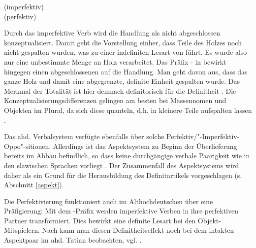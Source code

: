 \begin{exe}
	\ex \label{ex:russ-aspekt}   
	\begin{xlist}
		\ex \label{ex:russ-imper}  (imperfektiv) \\ 
		\ex \label{ex:russ-per}  (perfektiv) \\ 
		\end{xlist}
\end{exe}
\noindent
Durch das imperfektive Verb  wird die Handlung als nicht abgeschlossen konzeptualisiert. Damit  geht die Vorstellung einher, dass Teile des Holzes noch nicht gespalten wurden, was zu einer indefiniten Lesart von   führt. Es wurde also nur eine unbestimmte Menge an Holz verarbeitet. Das Präfix - in  bewirkt hingegen einen abgeschlossenen   auf die Handlung. Man geht davon aus, dass das ganze Holz und damit eine abgegrenzte, definite Einheit gespalten wurde.
Das Merkmal der Totalität ist hier demnach definitorisch für die Definitheit \parencite[14]{Leiss2000}. Die Konzeptualisierungsdifferenzen gelingen am besten bei Massennomen und Objekten im Plural, da sich diese quanteln, d.h. in kleinere Teile aufspalten lassen \parencite{Heindl2016}. 

Das ahd. Verbalsystem verfügte ebenfalls über solche Perfektiv/"-Imperfektiv-Oppo"-sitionen. Allerdings ist das Aspektsystem zu Beginn der Überlieferung bereits im Abbau befindlich, so dass keine durchgängige verbale Paarigkeit wie in den slawischen Sprachen vorliegt \parencite[3]{Eroms1997}. Der Zusammenfall des Aspektsystems wird daher als ein Grund für die Herausbildung des Definitartikels vorgeschlagen (s. Abschnitt \ref{aspekt}). 


Die Perfektivierung funktioniert auch im Althochdeutschen über eine Präfigierung: Mit dem -Präfix werden imperfektive Verben in ihre perfektiven Partner transformiert. Dies bewirkt eine definite Lesart bei den Objekt-Mitspielern. Nach \textcite[176--181]{Leiss2000} kann man diesen Definitheitseffekt noch bei dem intakten Aspektpaar  im ahd. Tatian beobachten, vgl. . 

